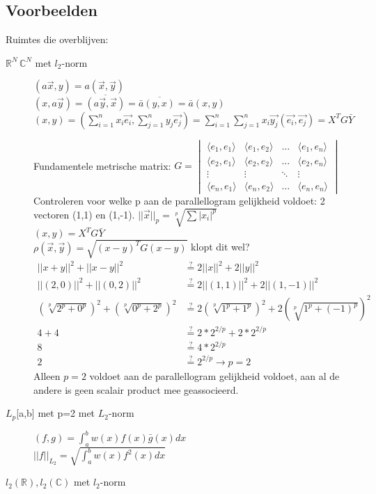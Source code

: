 \subsection{Voorbeelden}
Ruimtes die overblijven: \\
\begin{description}
\item [$\mathbb{R}^N\, \mathbb{C}^N$ met $l_2$-norm]
$ (a\vec{x},y)=a(\vec{x},\vec{y}) $ \\
$(x,a\vec{y})=\overline{(a\vec{y},\vec{x})}=\bar{a}\overline{(y,x)}=\bar{a}(x,y)$ \\
$(x,y)=(\sum_{i=1}^n x_i \vec{e_i},\sum_{j=1}^n y_j \vec{e_j})=\sum_{i=1}^n\sum_{j=1}^n  x_i \vec{y_j}(\vec{e_i},\vec{e_j})=X^TG\bar{Y}$

Fundamentele metrische matrix: $G={\begin{vmatrix}\langle e_{1},e_{1}\rangle &\langle e_{1},e_{2}\rangle &\dots &\langle e_{1},e_{n}\rangle \\\langle e_{2},e_{1}\rangle &\langle e_{2},e_{2}\rangle &\dots &\langle e_{2},e_{n}\rangle \\\vdots &\vdots &\ddots &\vdots \\\langle e_{n},e_{1}\rangle &\langle e_{n},e_{2}\rangle &\dots &\langle e_{n},e_{n}\rangle \end{vmatrix}}$ \\

Controleren voor welke p aan de parallellogram gelijkheid voldoet:
2 vectoren (1,1) en (1,-1).
$ ||\vec{x} ||_p = \sqrt[p]{\sum |x_i|^p}$ \\
$ (x,y) = X^TG\bar{Y} $ \\
$\rho(\vec{x},\vec{y}) = \sqrt{(x-y)^TG(x-y)}$ klopt dit wel?  \\ %
\begin{align*}
||x+y ||^2 + ||x-y||^2 &\stackrel{?}{=} 2 ||x||^2+2||y||^2  \\
||(2,0)||^2 + ||(0,2)||^2  &\stackrel{?}{=} 2 ||(1,1)||^2+2||(1,-1)||^2 \\
(\sqrt[p]{2^p+0^p})^2+(\sqrt[p]{0^p+2^p})^2 &\stackrel{?}{=} 2(\sqrt[p]{1^p+1^p})^2+2(\sqrt[p]{1^p+(-1)^p})^2 \\
4 + 4 &\stackrel{?}{=} 2*2^{2/p}+2*2^{2/p} \\
8 &\stackrel{?}{=} 4*2^{2/p} \\
2 &\stackrel{?}{=} 2^{2/p} \rightarrow p=2
\end{align*}
Alleen $p=2$ voldoet aan de parallellogram gelijkheid voldoet, aan al de andere is geen scalair product mee geassocieerd. 

\item [$L_p${[a,b]} met p=2 met $L_2$-norm] 


$(f,g)=\int_a^bw(x)f(x)\bar{g}(x) dx$ \\
$||f||_{L_2} = \sqrt{\int_a^b w(x) f^2(x) dx }$

\item[$l_2 (\mathbb{R}),l_2(\mathbb{C})$ met $l_2$-norm]
\end{description}

